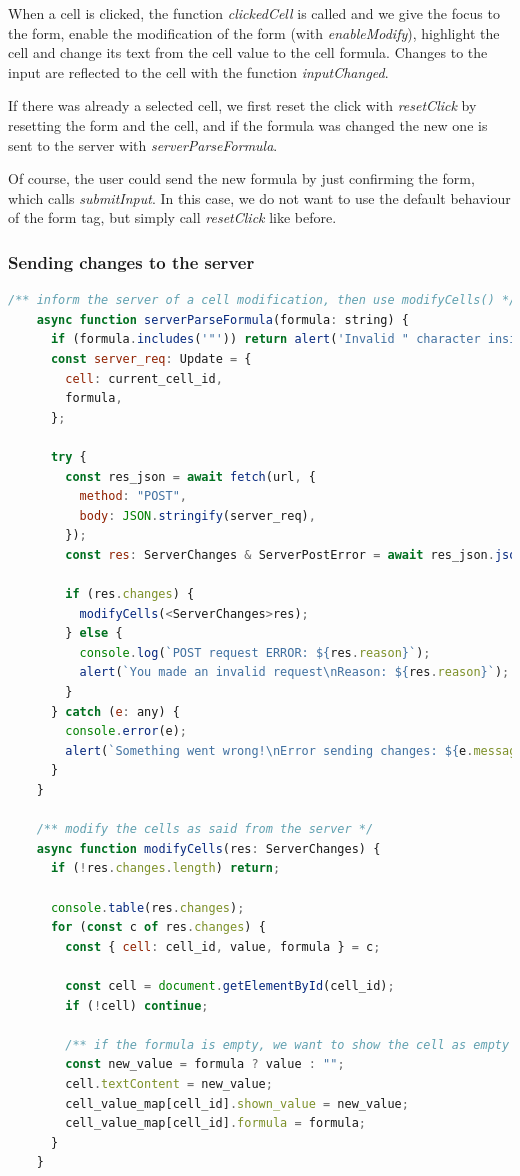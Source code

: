 \documentclass[12pt, a4paper]{article}
\begin{document}
  When a cell is clicked, the function \textit{clickedCell} is called and we give the focus to the form, enable the modification of the form (with \textit{enableModify}), highlight the cell and change its text from the cell value to the cell formula. Changes to the input are reflected to the cell with the function \textit{inputChanged}.

  If there was already a selected cell, we first reset the click with \textit{resetClick} by resetting the form and the cell, and if the formula was changed the new one is sent to the server with \textit{serverParseFormula}.

  Of course, the user could send the new formula by just confirming the form, which calls \textit{submitInput}. In this case, we do not want to use the default behaviour of the form tag, but simply call \textit{resetClick} like before.

  \subsubsection{Sending changes to the server}
  \begin{lstlisting}[language=javascript, caption={Send changes}]
    /** inform the server of a cell modification, then use modifyCells() */
    async function serverParseFormula(formula: string) {
      if (formula.includes('"')) return alert('Invalid " character inside input');
      const server_req: Update = {
        cell: current_cell_id,
        formula,
      };

      try {
        const res_json = await fetch(url, {
          method: "POST",
          body: JSON.stringify(server_req),
        });
        const res: ServerChanges & ServerPostError = await res_json.json();

        if (res.changes) {
          modifyCells(<ServerChanges>res);
        } else {
          console.log(`POST request ERROR: ${res.reason}`);
          alert(`You made an invalid request\nReason: ${res.reason}`);
        }
      } catch (e: any) {
        console.error(e);
        alert(`Something went wrong!\nError sending changes: ${e.message}`);
      }
    }

    /** modify the cells as said from the server */
    async function modifyCells(res: ServerChanges) {
      if (!res.changes.length) return;

      console.table(res.changes);
      for (const c of res.changes) {
        const { cell: cell_id, value, formula } = c;

        const cell = document.getElementById(cell_id);
        if (!cell) continue;

        /** if the formula is empty, we want to show the cell as empty */
        const new_value = formula ? value : "";
        cell.textContent = new_value;
        cell_value_map[cell_id].shown_value = new_value;
        cell_value_map[cell_id].formula = formula;
      }
    }
  \end{lstlisting}
\end{document}
